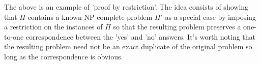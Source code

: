 	The above is an example of 'proof by restriction'. The idea consists of showing that $\Pi$ contains a known NP-complete problem $\Pi'$ as a special case by imposing a restriction on the instances of $\Pi$ so that the resulting problem preserves a one-to-one correspondence between the 'yes' and 'no' answers. It's worth noting that the resulting problem need not be an exact duplicate of the original problem so long as the correspondence is obvious. 
	
